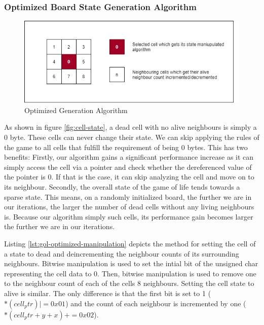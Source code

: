 \documentclass[a4paper,english,12pt,twoside=false]{scrartcl} %
\begin{document}
\subsubsection{Optimized Board State Generation Algorithm}

\begin{figure}[tbh!]
	\centering
	\includegraphics[width=16cm]{imgs/cell-algo.png}
	\caption{Optimized Generation Algorithm}
	\label{fig:cell-algo}
\end{figure}

As shown in figure \ref{fig:cell-state}, a dead cell with no alive neighbours is simply a 0 byte. These cells can never change their state. We can skip applying the rules of the game to all cells that fulfill the requirement of being 0 bytes. This has two benefits: Firstly, our algorithm gains a significant performance increase as it can simply access the cell via a pointer and check whether the dereferenced value of the pointer is 0. If that is the case, it can skip analyzing the cell and move on to its neighbour. Secondly, the overall state of the game of life tends towards a sparse state. This means, on a randomly initialized board, the further we are in our iterations, the larger the number of dead cells without any living neighbours is. Because our algorithm simply such cells, its performance gain becomes larger the further we are in our iterations.


Listing \ref{lst:gol-optimized-manipulation} depicts the method for setting the cell of a state to dead and deincrementing the neighbour counts of its surrounding neighbours. Bitwise manipulation is used to set the intial bit of the unsigned char representing the cell data to 0. Then, bitwise manipulation is used to remove one to the neighbour count of each of the cells 8 neighbours. Setting the cell state to alive is similar. The only difference is that the first bit is set to 1 ($*(cell_ptr) |= 0x01$)  and the count of each neighbour is incremented by one ($*(cell_ptr + y + x) += 0x02$).
\end{document}
